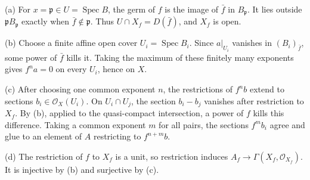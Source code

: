 (a) For $x=\mathfrak p\in U=\operatorname{Spec}B$, the germ of $f$ is the image of $\bar f$ in $B_{\mathfrak p}$. It lies outside $\mathfrak pB_{\mathfrak p}$ exactly when $\bar f\notin\mathfrak p$. Thus $U\cap X_f=D(\bar f)$, and $X_f$ is open.

(b) Choose a finite affine open cover $U_i=\operatorname{Spec}B_i$. Since $a|_{U_i}$ vanishes in $(B_i)_{\bar f}$, some power of $\bar f$ kills it. Taking the maximum of these finitely many exponents gives $f^na=0$ on every $U_i$, hence on $X$.

(c) After choosing one common exponent $n$, the restrictions of $f^nb$ extend to sections $b_i\in\mathcal O_X(U_i)$. On $U_i\cap U_j$, the section $b_i-b_j$ vanishes after restriction to $X_f$. By (b), applied to the quasi-compact intersection, a power of $f$ kills this difference. Taking a common exponent $m$ for all pairs, the sections $f^mb_i$ agree and glue to an element of $A$ restricting to $f^{n+m}b$.

(d) The restriction of $f$ to $X_f$ is a unit, so restriction induces $A_f\to\Gamma(X_f,\mathcal O_{X_f})$. It is injective by (b) and surjective by (c).
